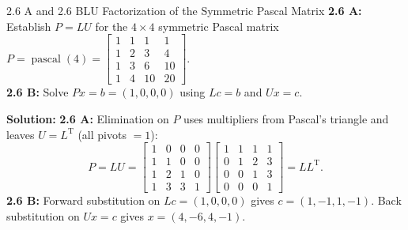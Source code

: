 \documentclass[11pt,a4paper,openany,oneside]{book}
\def\vect#1{#1}%
\def\mathbf#1{#1}%
\newcommand{\vect}[1]{\mathbf{#1}}
\newcommand{\T}{\mathrm{T}}
\numberwithin{equation}{chapter}
\begin{document}
\begin{example}{2.6 A and 2.6 B}{LU Factorization of the Symmetric Pascal Matrix}
\textbf{2.6 A:} Establish $P = LU$ for the $4\times 4$ symmetric Pascal matrix $P = \operatorname{pascal}(4) = \begin{bmatrix}1&1&1&1\\1&2&3&4\\1&3&6&10\\1&4&10&20\end{bmatrix}$.\\
\textbf{2.6 B:} Solve $P\vect{x} = \vect{b} = (1,0,0,0)$ using $L\vect{c} = \vect{b}$ and $U\vect{x} = \vect{c}$.
\end{example}
\textbf{Solution:}
\textbf{2.6 A:} Elimination on $P$ uses multipliers from Pascal's triangle and leaves $U = L^\T$ (all pivots $= 1$):
\[
P = LU = \begin{bmatrix}1&0&0&0\\1&1&0&0\\1&2&1&0\\1&3&3&1\end{bmatrix}\begin{bmatrix}1&1&1&1\\0&1&2&3\\0&0&1&3\\0&0&0&1\end{bmatrix} = LL^\T.
\]
\textbf{2.6 B:} Forward substitution on $L\vect{c} = (1,0,0,0)$ gives $\vect{c} = (1,-1,1,-1)$. Back substitution on $U\vect{x} = \vect{c}$ gives $\vect{x} = (4,-6,4,-1)$.
\end{document}
